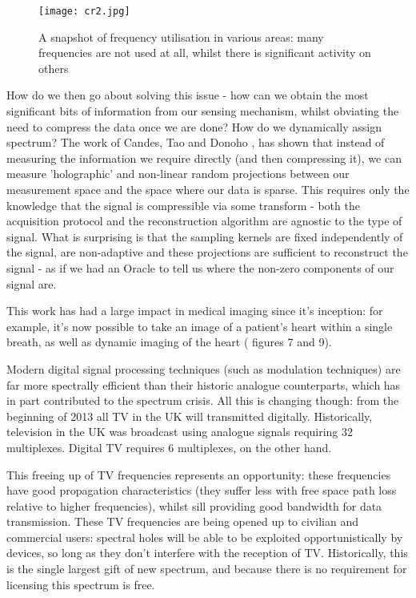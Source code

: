 \begin{figure*}[h]
\centering
\texttt{[image: cr2.jpg]}
\caption{A snapshot of frequency utilisation in various areas: many frequencies are not used at all, whilst there is significant activity on others \cite{Burbidge2007}}
\label{frequtil}
\end{figure*}

How do we then go about solving this issue - how can we obtain the most significant bits of information from our sensing mechanism, whilst obviating the need to compress the data once we are done? How do we dynamically assign spectrum? The work of Candes, Tao \cite{Candes2006} and Donoho \cite{donoho2}, has shown that instead of measuring the information we require directly (and then compressing it), we can measure 'holographic' and non-linear random projections between our measurement space and the space where our data is sparse. This requires only the knowledge that the signal is compressible via some transform - both the acquisition protocol and the reconstruction algorithm are agnostic to the type of signal. What is surprising is that the sampling kernels are fixed independently of the signal, are non-adaptive and these projections are sufficient to reconstruct the signal - as if we had an Oracle to tell us where the non-zero components of our signal are. 

This work has had a large impact in medical imaging since it's inception: for example, it's now possible to take an image of a patient's heart within a single breath, as well as dynamic imaging of the heart (\cite{Donoho} figures 7 and 9).

Modern digital signal processing techniques (such as modulation techniques) are far more spectrally efficient than their historic analogue counterparts, which has in part contributed to the spectrum crisis. All this is changing though: from the beginning of 2013 all TV in the UK will transmitted digitally. Historically, television in the UK was broadcast using analogue signals requiring 32 multiplexes. Digital TV requires 6 multiplexes, on the other hand. 

This freeing up of TV frequencies represents an opportunity: these frequencies have good propagation characteristics (they suffer less with free space path loss relative to higher frequencies), whilst sill providing good bandwidth for data transmission. These TV frequencies are being opened up to civilian and  commercial users: spectral holes will be able to be exploited opportunistically by devices, so long as they don't interfere with the reception of TV. Historically, this is the single largest gift of new spectrum, and because there is no requirement for licensing this spectrum is free.

